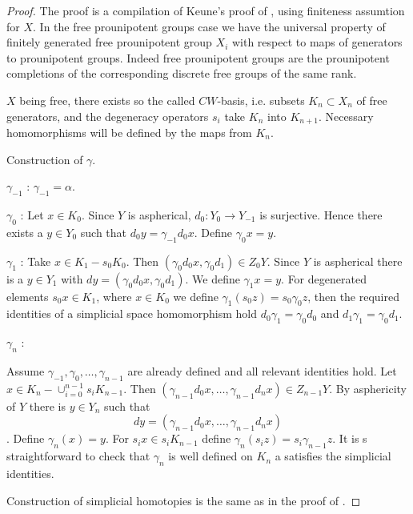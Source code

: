 \documentclass[11pt,a4paper]{article}
\begin{document}
\begin{proof} The proof is a compilation of Keune's proof of \cite[Theorem 2]{Ke}, using finiteness assumtion for $X$. 
In the free prounipotent groups case we have the universal property of finitely generated free prounipotent group $X_i$ with respect to maps of generators to prounipotent groups. 
Indeed free prounipotent groups are the prounipotent completions of the corresponding discrete free groups of the same rank. 

$X$ being free, there exists so the called $CW$-basis, i.e. subsets $K_n\subset X_n$ of free generators, and the degeneracy operators $s_i$ take $K_n $ into $K_{n+1}$.
Necessary homomorphisms will be defined by the maps from $K_n$.

Construction of $\gamma$.

$\gamma_{-1}$ : $\gamma_{-1}=\alpha$.

$\gamma_0$  : Let $x\in K_0$. Since $Y$ is aspherical, $d_0: Y_0\rightarrow Y_{-1}$ is surjective. Hence there exists a $y\in Y_0$ such that $d_0 y=\gamma_{-1} d_0 x$. Define $\gamma_0 x=y$.

$\gamma_1$ : Take $x\in K_1 - s_0 K_0$. Then $(\gamma_0 d_0 x, \gamma_0 d_1)\in Z_0 Y$. Since $Y$ is aspherical there is a $y\in Y_1$ with $dy=(\gamma_0 d_0 x, \gamma_0 d_1)$. We define $\gamma_1 x=y$. For degenerated elements $s_0 x\in K_1$, where $x\in K_0$ we define 
$\gamma_1(s_0 z)=s_0 \gamma_0 z$, then the required identities of a simplicial space homomorphism hold $d_0\gamma_1=\gamma_0 d_0$ and $d_1\gamma_1 = \gamma_0 d_1$.

$\gamma_n$ : 

Assume $\gamma_{-1}, \gamma_0, \ldots,\gamma_{n-1}$ are already defined and all relevant identities hold. Let $x\in K_n-\cup^{n-1}_{i=0}s_i K_{n-1}$. 
Then $(\gamma_{n-1} d_0 x, \ldots, \gamma_{n-1} d_n x)\in Z_{n-1}Y$. By asphericity of $Y$ there is  $y\in Y_n$ such that $$dy=(\gamma_{n-1} d_0 x, \ldots, \gamma_{n-1} d_n x)$$. 
Define $\gamma_n(x)=y$. 
For $s_i x\in s_i K_{n-1}$ define $\gamma_n (s_i z)=s_i\gamma_{n-1}z$. It is s straightforward to check that $\gamma_n$ is well defined on $K_n$ a satisfies the simplicial identities.

Construction of simplicial homotopies is the same as in the proof of \cite[Theorem 2]{Ke}. 
\end{proof}
\end{document}
